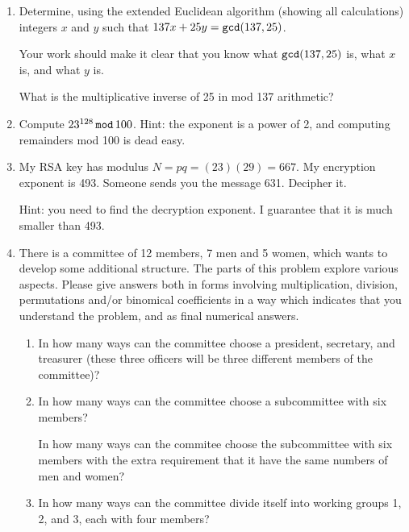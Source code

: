 \documentclass[12pt]{article}
\begin{document}
\begin{enumerate}
\item  Determine, using the extended Euclidean algorithm (showing all calculations) integers $x$ and $y$ such that
$137x+25y = {\tt gcd}(137,25)$.

Your work should make it clear that you know  what ${\tt gcd}(137,25)$ is, what $x$ is, and what $y$ is.

What is the multiplicative inverse of 25 in mod 137 arithmetic?

\newpage

\item  Compute $23^{128} \,{\tt mod} \,100$.  Hint:  the exponent is a power of 2, and computing remainders mod 100 is
dead easy.

\newpage

\item  My RSA key has modulus $N=pq=(23)(29)=667$.  My encryption exponent is 493.   Someone sends you the message 631.  Decipher it.

Hint:  you need to find the decryption exponent.  I guarantee that it is much smaller than 493.

\newpage

\item   There is a committee of 12 members, 7 men and 5 women, which wants to develop some additional structure.
The parts of this problem explore various aspects.  Please give answers both in forms involving multiplication, division, permutations and/or binomical coefficients in a way which indicates that you understand the problem, and as final numerical answers.

\begin{enumerate}

\item  In how many ways can the committee choose a president, secretary, and treasurer (these three officers will be three different members of the committee)?

\newpage

\item  In how many ways can the committee choose a subcommittee with six members?

In how many ways can the commitee choose  the subcommittee with six members with the extra requirement that it have the same numbers of men and women?

\newpage

\item  In how many ways can the committee divide itself into working groups 1, 2, and 3, each with four members?


\end{enumerate}
\end{enumerate}
\end{document}

